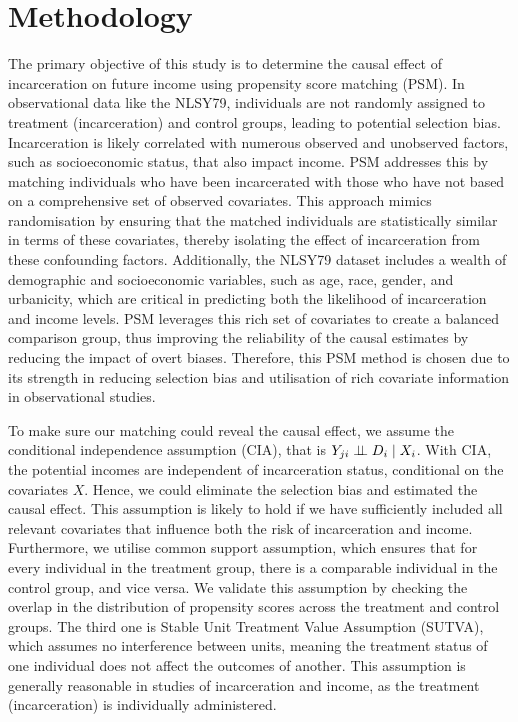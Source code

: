 \documentclass{article}[12pt]
\begin{document}
\section{Methodology} %
The primary objective of this study is to determine the causal effect of incarceration on future income using propensity score matching (PSM). In observational data like the NLSY79, individuals are not randomly assigned to treatment (incarceration) and control groups, leading to potential selection bias. Incarceration is likely correlated with numerous observed and unobserved factors, such as socioeconomic status, that also impact income. PSM addresses this by matching individuals who have been incarcerated with those who have not based on a comprehensive set of observed covariates. This approach mimics randomisation by ensuring that the matched individuals are statistically similar in terms of these covariates, thereby isolating the effect of incarceration from these confounding factors. Additionally, the NLSY79 dataset includes a wealth of demographic and socioeconomic variables, such as age, race, gender, and urbanicity, which are critical in predicting both the likelihood of incarceration and income levels. PSM leverages this rich set of covariates to create a balanced comparison group, thus improving the reliability of the causal estimates by reducing the impact of overt biases. Therefore, this PSM method is chosen due to its strength in reducing selection bias and utilisation of rich covariate information in observational studies. 
\par
To make sure our matching could reveal the causal effect, we assume the conditional independence assumption (CIA), that is $Y_{ji}\perp\kern-5pt\perp D_i \mid X_i$. With CIA, the potential incomes are independent of incarceration status, conditional on the covariates $X$. Hence, we could eliminate the selection bias and estimated the causal effect. This assumption is likely to hold if we have sufficiently included all relevant covariates that influence both the risk of incarceration and income. Furthermore, we utilise common support assumption, which ensures that for every individual in the treatment group, there is a comparable individual in the control group, and vice versa. We validate this assumption by checking the overlap in the distribution of propensity scores across the treatment and control groups. The third one is Stable Unit Treatment Value Assumption (SUTVA), which assumes no interference between units, meaning the treatment status of one individual does not affect the outcomes of another. This assumption is generally reasonable in studies of incarceration and income, as the treatment (incarceration) is individually administered. 
\par
\end{document}
